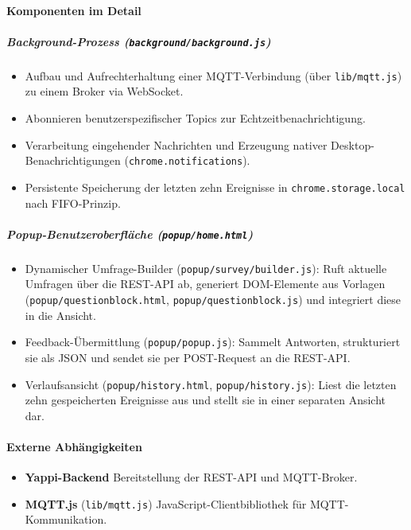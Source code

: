 \documentclass[12pt,a4paper]{report}
\begin{document}
\paragraph{Komponenten im Detail}

\subparagraph{Background-Prozess (\texttt{background/background.js})}
\begin{itemize}
  \item Aufbau und Aufrechterhaltung einer MQTT-Verbindung (über \texttt{lib/mqtt.js}) zu einem Broker via WebSocket.
  \item Abonnieren benutzerspezifischer Topics zur Echtzeitbenachrichtigung.
  \item Verarbeitung eingehender Nachrichten und Erzeugung nativer Desktop-Benachrichtigungen (\texttt{chrome.notifications}).
  \item Persistente Speicherung der letzten zehn Ereignisse in \texttt{chrome.storage.local} nach FIFO-Prinzip.
\end{itemize}

\subparagraph{Popup-Benutzeroberfläche (\texttt{popup/home.html})}
\begin{itemize}
  \item Dynamischer Umfrage-Builder (\texttt{popup/survey/builder.js}):
        Ruft aktuelle Umfragen über die REST-API ab, generiert DOM-Elemente aus Vorlagen (\texttt{popup/questionblock.html},
        \texttt{popup/questionblock.js}) und integriert diese in die Ansicht.
  \item Feedback-Übermittlung (\texttt{popup/popup.js}):
        Sammelt Antworten, strukturiert sie als JSON und sendet sie per POST-Request an die REST-API.
  \item Verlaufsansicht (\texttt{popup/history.html}, \texttt{popup/history.js}):
        Liest die letzten zehn gespeicherten Ereignisse aus und stellt sie in einer separaten Ansicht dar.
\end{itemize}

\paragraph{Externe Abhängigkeiten}
\begin{itemize}
  \item \textbf{Yappi-Backend} Bereitstellung der REST-API und MQTT-Broker.
  \item \textbf{MQTT.js} (\texttt{lib/mqtt.js}) JavaScript-Clientbibliothek für MQTT-Kommunikation.
\end{itemize}
\end{document}
